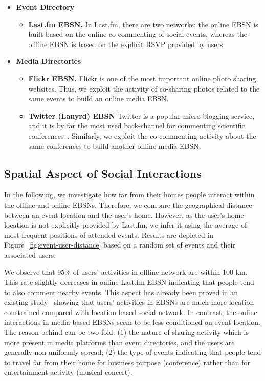 \vspace{2mm}
\begin{itemize}
\item \textbf{Event Directory}
	\begin{itemize}
	\item {\textbf{Last.fm EBSN.}} In Last.fm, there are two networks: the online EBSN is built based on the online co-commenting of social events, whereas the offline 		EBSN is based on the explicit RSVP provided by users.
	\end{itemize}

\item \textbf{Media Directories}
	\begin{itemize}
	\item {\textbf{Flickr EBSN.}} Flickr is one of the most important online photo sharing websites. Thus, we exploit the activity of co-sharing photos related to the same events to build an online media EBSN.

	\item {\textbf{Twitter (Lanyrd) EBSN}} Twitter is a popular micro-blogging service, and it is by far the most used back-channel for commenting scientific conferences~\cite{Khrouf:RAMSS12}. Similarly, we exploit the co-commenting activity about the same conferences to build another online media EBSN.
	\end{itemize}
\end{itemize}


\subsection{Spatial Aspect of Social Interactions}   \label{sec:spatial-aspect}
In the following, we investigate how far from their homes people interact within the offline and online EBSNs. Therefore, we compare the geographical distance between an event location and the user's home. However, as the user's home location is not explicitly provided by Last.fm, we infer it using the average of most frequent positions of attended events. Results are depicted in Figure~\ref{fig:event-user-distance} based on a random set of events and their associated users.

We observe that 95\% of users' activities in offline network are within 100 km. This rate slightly decreases in online Last.fm EBSN indicating that people tend to also comment nearby events. This aspect has already been proved in an existing study~\cite{Liu:KDD12} showing that users' activities in EBSNs are much more location constrained compared with location-based social network. In contrast, the online interactions in media-based EBSNs seem to be less conditioned on event location. The reason behind can be two-fold: (1) the nature of sharing activity which is more present in media platforms than event directories, and the users are generally non-uniformly spread; (2) the type of events indicating that people tend to travel far from their home for business purpose (conference) rather than for entertainment activity (musical concert).  

